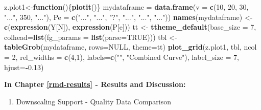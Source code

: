 \documentclass[12pt,oneside]{reedthesis}
\newenvironment{Shaded}{\begin{snugshade}}{\end{snugshade}}
\newcommand{\ControlFlowTok}[1]{\textcolor[rgb]{0.13,0.29,0.53}{\textbf{#1}}}
\newcommand{\DataTypeTok}[1]{\textcolor[rgb]{0.13,0.29,0.53}{#1}}
\newcommand{\DecValTok}[1]{\textcolor[rgb]{0.00,0.00,0.81}{#1}}
\newcommand{\FloatTok}[1]{\textcolor[rgb]{0.00,0.00,0.81}{#1}}
\newcommand{\KeywordTok}[1]{\textcolor[rgb]{0.13,0.29,0.53}{\textbf{#1}}}
\newcommand{\NormalTok}[1]{#1}
\newcommand{\OperatorTok}[1]{\textcolor[rgb]{0.81,0.36,0.00}{\textbf{#1}}}
\newcommand{\OtherTok}[1]{\textcolor[rgb]{0.56,0.35,0.01}{#1}}
\newcommand{\StringTok}[1]{\textcolor[rgb]{0.31,0.60,0.02}{#1}}
\providecommand{\tightlist}{%
  \setlength{\itemsep}{0pt}\setlength{\parskip}{0pt}}
\begin{document}
\begin{Shaded}
\begin{Highlighting}[]
\NormalTok{z.plot1<-}\ControlFlowTok{function}\NormalTok{()\{}\KeywordTok{plotit}\NormalTok{()\}}
\NormalTok{mydataframe =}\StringTok{ }\KeywordTok{data.frame}\NormalTok{(}\DataTypeTok{v =} \KeywordTok{c}\NormalTok{(}\DecValTok{10}\NormalTok{, }\DecValTok{20}\NormalTok{, }\DecValTok{30}\NormalTok{, }\StringTok{"..."}\NormalTok{, }\DecValTok{350}\NormalTok{, }\StringTok{"..."}\NormalTok{), }\DataTypeTok{Pe =} \KeywordTok{c}\NormalTok{(}\StringTok{"..."}\NormalTok{, }\StringTok{"..."}\NormalTok{, }\StringTok{"?"}\NormalTok{, }\StringTok{"..."}\NormalTok{, }\StringTok{"..."}\NormalTok{, }\StringTok{"..."}\NormalTok{))}
\KeywordTok{names}\NormalTok{(mydataframe) <-}\StringTok{ }\KeywordTok{c}\NormalTok{(}\KeywordTok{expression}\NormalTok{(Y[N]), }\KeywordTok{expression}\NormalTok{(P[e]))}
\NormalTok{tt <-}\StringTok{ }\KeywordTok{ttheme_default}\NormalTok{(}\DataTypeTok{base_size =} \DecValTok{7}\NormalTok{, }\DataTypeTok{colhead=}\KeywordTok{list}\NormalTok{(}\DataTypeTok{fg_params =} \KeywordTok{list}\NormalTok{(}\DataTypeTok{parse=}\OtherTok{TRUE}\NormalTok{)))}
\NormalTok{tbl <-}\StringTok{ }\KeywordTok{tableGrob}\NormalTok{(mydataframe, }\DataTypeTok{rows=}\OtherTok{NULL}\NormalTok{, }\DataTypeTok{theme=}\NormalTok{tt)}
\KeywordTok{plot_grid}\NormalTok{(z.plot1, tbl, }\DataTypeTok{ncol =} \DecValTok{2}\NormalTok{, }\DataTypeTok{rel_widths =} \KeywordTok{c}\NormalTok{(}\DecValTok{4}\NormalTok{,}\DecValTok{1}\NormalTok{), }\DataTypeTok{labels=}\KeywordTok{c}\NormalTok{(}\StringTok{""}\NormalTok{, }\StringTok{"Combined Curve"}\NormalTok{), }\DataTypeTok{label_size =} \DecValTok{7}\NormalTok{, }\DataTypeTok{hjust=}\OperatorTok{-}\FloatTok{0.13}\NormalTok{)}
\end{Highlighting}
\end{Shaded}
\normalsize

\textbf{In Chapter \ref{rmd-results} - Results and Discussion:}
\begin{enumerate}
\def\labelenumi{\arabic{enumi}.}
\tightlist
\item
  Downscaling Support - Quality Data Comparison
\end{enumerate}
\tiny
\end{document}
